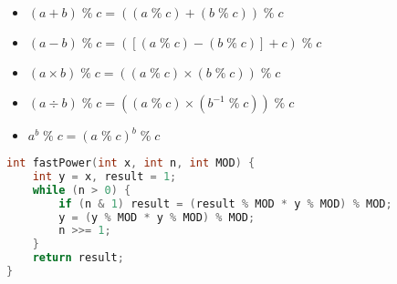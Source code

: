 \begin{itemize}
	\item $\left(a + b\right) \;\%\; c = 
	      \left(\left(a \;\%\; c\right) + 
	      \left(b \;\%\; c\right)\right) \;\%\; c$
	\item $\left(a - b\right) \;\%\; c = 
	      \left(\left[\left(a \;\%\; c\right) -
	      \left(b \;\%\; c\right)\right] + c\right) \;\%\; c$
	\item $\left(a \times b\right) \;\%\; c = 
	      \left(\left(a \;\%\; c\right) \times
	      \left(b \;\%\; c\right)\right) \;\%\; c$
	\item $\left(a \div b\right) \;\%\; c = 
	      \left(\left(a \;\%\; c\right) \times
	      \left(b^{-1} \;\%\; c\right)\right) \;\%\; c$
	\item $a^{b} \;\%\; c = \left(a \;\%\; c\right)^{b} \;\%\; c$
\end{itemize}

\begin{lstlisting}[language=C++, title=Exponenciação Modular]
int fastPower(int x, int n, int MOD) {
    int y = x, result = 1;
    while (n > 0) {
        if (n & 1) result = (result % MOD * y % MOD) % MOD;
        y = (y % MOD * y % MOD) % MOD;
        n >>= 1;
    }
    return result;
}
\end{lstlisting}
